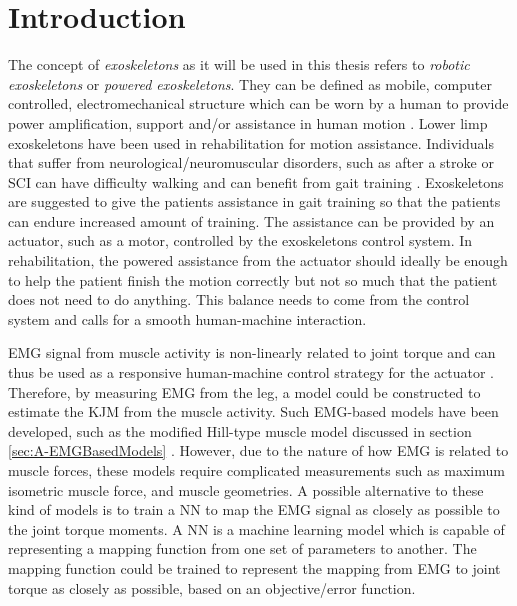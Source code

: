 \documentclass[../main.tex]{subfiles}
\begin{document}
\chapter{Introduction}
The concept of \textit{exoskeletons} as it will be used in this thesis refers to \textit{robotic exoskeletons} or \textit{powered exoskeletons}. 
They can be defined as mobile, computer controlled, electromechanical structure which can be worn by a human to provide power amplification, support and/or assistance in human motion \cite{Anam2012, Gorgey2018}. 
Lower limp exoskeletons have been used in rehabilitation for motion assistance.
Individuals that suffer from neurological/neuromuscular disorders, such as after a stroke or \ac{SCI} can have difficulty walking and can benefit from gait training \cite{Gorgey2018, Young2017, Lerner2017}.
Exoskeletons are suggested to give the patients assistance in gait training so that the patients can endure increased amount of training.
The assistance can be provided by an actuator, such as a motor, controlled by the exoskeletons control system.
In rehabilitation, the powered assistance from the actuator should ideally be enough to help the patient finish the motion correctly but not so much that the patient does not need to do anything.
This balance needs to come from the control system and calls for a smooth human-machine interaction.

\Ac{EMG} signal from muscle activity is non-linearly related to joint torque and can thus be used as a responsive human-machine control strategy for the actuator \cite{Young2017}.
Therefore, by measuring \ac{EMG} from the leg, a model could be constructed to estimate the \ac{KJM} from the muscle activity.
Such \ac{EMG}-based models have been developed, such as the modified Hill-type muscle model discussed in section \ref{sec:A-EMGBasedModels} \cite{Pizzolato2015, Erdemir2007, Lloyd2003}.
However, due to the nature of how \ac{EMG} is related to muscle forces, these models require complicated measurements such as maximum isometric muscle force, and muscle geometries.
A possible alternative to these kind of models is to train a \ac{NN} to map the \ac{EMG} signal as closely as possible to the joint torque moments.
A \ac{NN} is a machine learning model which is capable of representing a mapping function from one set of parameters to another. 
The mapping function could be trained to represent the mapping from \ac{EMG} to joint torque as closely as possible, based on an objective/error function.


\end{document}
